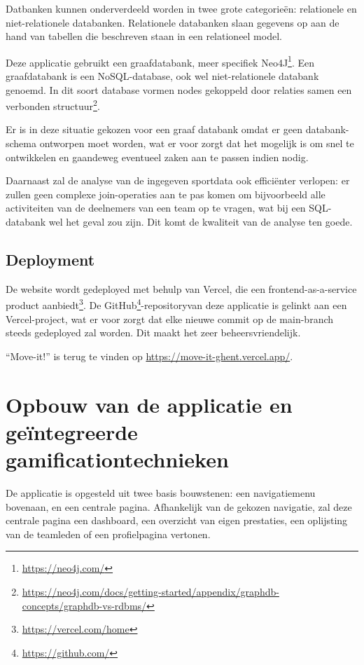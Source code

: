 Datbanken kunnen onderverdeeld worden in twee grote categorieën: relationele en niet-relationele databanken.
Relationele databanken slaan gegevens op aan de hand van tabellen die beschreven staan in een relationeel model. 

Deze applicatie gebruikt een graafdatabank, meer specifiek Neo4J\footnote{\href{https://neo4j.com/}{https://neo4j.com/}}.
Een graafdatabank is een NoSQL-database, ook wel niet-relationele databank genoemd. In dit soort database vormen nodes gekoppeld door relaties samen een verbonden  structuur\footnote{\href{https://neo4j.com/docs/getting-started/appendix/graphdb-concepts/graphdb-vs-rdbms/}{https://neo4j.com/docs/getting-started/appendix/graphdb-concepts/graphdb-vs-rdbms/}}.

Er is in deze situatie gekozen voor een graaf databank omdat er geen databank-schema ontworpen moet worden, wat er voor zorgt dat het mogelijk is om snel te ontwikkelen en gaandeweg eventueel zaken aan te passen indien nodig.

Daarnaast zal de analyse van de ingegeven sportdata ook efficiënter verlopen: er zullen geen complexe join-operaties aan te pas komen om bijvoorbeeld alle activiteiten van de deelnemers van een team op te vragen, wat bij een SQL-databank wel het geval zou zijn. Dit komt de kwaliteit van de analyse ten goede.

\subsection{Deployment}

De website wordt gedeployed met behulp van Vercel, die een frontend-as-a-service product aanbiedt\footnote{\href{https://vercel.com/home}{https://vercel.com/home}}. De GitHub\footnote{\href{https://github.com/}{https://github.com/}}-repositoryvan deze applicatie is gelinkt aan een Vercel-project, wat er voor zorgt dat elke nieuwe commit op de main-branch steeds gedeployed zal worden. Dit maakt het zeer beheersvriendelijk.

``Move-it!'' is terug te vinden op \href{https://move-it-ghent.vercel.app/}{https://move-it-ghent.vercel.app/}.

\section{Opbouw van de applicatie en geïntegreerde gamificationtechnieken}

De applicatie is opgesteld uit twee basis bouwstenen: een navigatiemenu bovenaan, en een centrale pagina. Afhankelijk van de gekozen navigatie, zal deze centrale pagina een dashboard, een overzicht van eigen prestaties, een oplijsting van de teamleden of een profielpagina vertonen.

